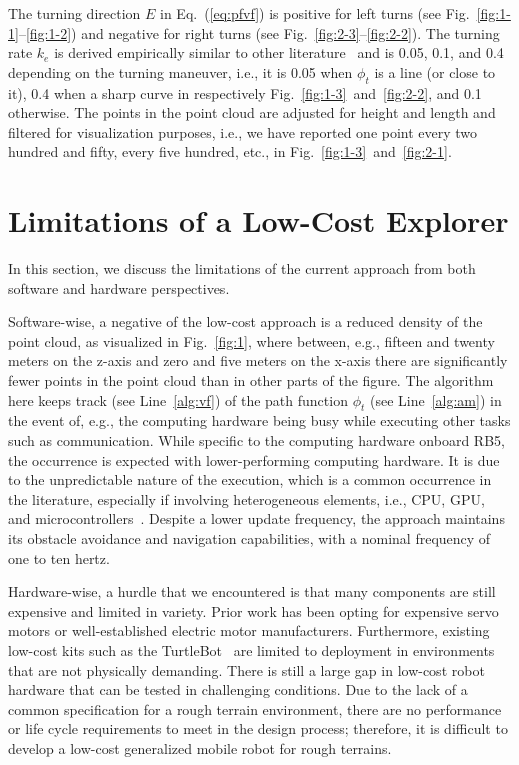 \documentclass[letterpaper,10pt,conference,twoside]{IEEEtran}
\theoremstyle{definition}
\begin{document}
The turning direction $E$ in Eq.~(\ref{eq:pfvf}) is positive for left turns (see Fig.~\ref{fig:1-1}--\ref{fig:1-2}) and negative for right turns (see Fig.~\ref{fig:2-3}--\ref{fig:2-2}). The turning rate $k_e$ is derived empirically similar to other literature~\cite{seewald2022energy,garcia2017guidance} and is 0.05, 0.1, and 0.4 depending on the turning maneuver, i.e., it is 0.05 when $\phi_t$ is a line (or close to it), 0.4 when a sharp curve in respectively Fig.~\ref{fig:1-3}~and~\ref{fig:2-2}, and 0.1 otherwise.  
The points in the point cloud are adjusted for height and length and filtered for visualization purposes, i.e., we have reported one point every two hundred and fifty, every five hundred, etc., in Fig.~\ref{fig:1-3}~and~\ref{fig:2-1}.


\section{Limitations of a Low-Cost Explorer}\label{sec:lim}
\noindent
In this section, we discuss 
the limitations of the current approach from both software and hardware perspectives.

Software-wise, a negative of the low-cost approach is a reduced density of the point cloud, as visualized in Fig.~\ref{fig:1}, where between, e.g., fifteen and twenty meters on the z-axis and zero and five meters on the x-axis there are significantly fewer points in the point cloud than in other parts of the figure. 
The algorithm here keeps track (see Line~\ref{alg:vf}) of the path function $\phi_t$ (see Line~\ref{alg:am}) in the event of, e.g., the computing hardware being busy while executing other tasks such as communication. While specific to the computing hardware onboard RB5, the occurrence is expected with lower-performing computing hardware. It is due to the unpredictable nature of the execution, which is a common occurrence in the literature, especially if involving heterogeneous elements, i.e., CPU, GPU, and microcontrollers~\cite{seewald2019coarse}.
Despite a lower update frequency, the approach maintains its obstacle avoidance and navigation capabilities, with a nominal frequency of one to ten hertz.

Hardware-wise, a hurdle that we encountered %
is that many components are still %
expensive and limited in variety. Prior work has been %
opting for expensive servo motors or well-established electric motor manufacturers.
%
Furthermore, existing low-cost %
kits such as the TurtleBot~\cite{amster2020turtlebot} are limited to deployment in %
environments that are not physically demanding. There is still a large gap in low-cost robot hardware that can be tested in challenging conditions. Due to the lack of a common specification %
for a rough terrain environment, there are no performance or life cycle requirements to meet in the %
design process; therefore, it is difficult to develop a low-cost generalized mobile robot for rough terrains.
\end{document}
